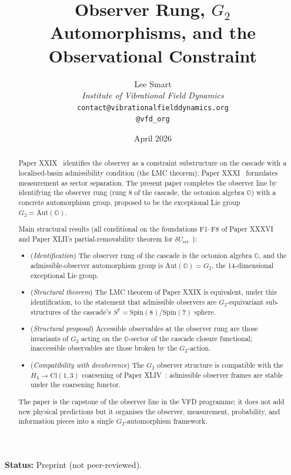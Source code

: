 \documentclass[12pt]{article}
\title{Observer Rung, $G_2$ Automorphisms, and the Observational Constraint}
\author{%
  Lee Smart\\[4pt]
  \textit{Institute of Vibrational Field Dynamics}\\[2pt]
  \texttt{contact@vibrationalfielddynamics.org}\\[2pt]
  \texttt{@vfd\_org}%
}
\date{April 2026}
\theoremstyle{definition}
\theoremstyle{remark}
\newcommand{\Oo}{\mathbb{O}}
\newcommand{\Gtwo}{G_2}
\newcommand{\Spin}{\mathrm{Spin}}
\newcommand{\Aut}{\mathrm{Aut}}
\newcommand{\Cl}{\mathrm{Cl}}
\begin{document}
\maketitle

\noindent\textbf{Status:} Preprint (not peer-reviewed).

\begin{abstract}
Paper XXIX~\citep{SmartXXIX} identifies the observer as a constraint substructure on the cascade with a localised-basin admissibility condition (the LMC theorem); Paper XXXI~\citep{SmartXXXI} formulates measurement as sector separation. The present paper completes the observer line by identifying the observer rung (rung $8$ of the cascade, the octonion algebra $\Oo$) with a concrete automorphism group, proposed to be the exceptional Lie group $\Gtwo = \Aut(\Oo)$.

Main structural results (all conditional on the foundations F1--F8 of Paper XXXVI~\citep{SmartXXXVI} and Paper XLII's partial-removability theorem for $\delta U_{\mathrm{rel}}$~\citep{SmartXLII}):
\begin{itemize}
\item (\emph{Identification}) The observer rung of the cascade is the octonion algebra $\Oo$, and the admissible-observer automorphism group is $\Aut(\Oo) = \Gtwo$, the 14-dimensional exceptional Lie group.
\item (\emph{Structural theorem}) The LMC theorem of Paper XXIX is equivalent, under this identification, to the statement that admissible observers are $\Gtwo$-equivariant sub-structures of the cascade's $S^7 = \Spin(8)/\Spin(7)$ sphere.
\item (\emph{Structural proposal}) Accessible observables at the observer rung are those invariants of $\Gtwo$ acting on the $\Oo$-sector of the cascade closure functional; inaccessible observables are those broken by the $\Gtwo$-action.
\item (\emph{Compatibility with decoherence}) The $\Gtwo$ observer structure is compatible with the $H_4 \to \Cl(1,3)$ coarsening of Paper XLIV~\citep{SmartXLIV}: admissible observer frames are stable under the coarsening functor.
\end{itemize}
The paper is the capstone of the observer line in the VFD programme; it does not add new physical predictions but it organises the observer, measurement, probability, and information pieces into a single $\Gtwo$-automorphism framework.
\end{abstract}

\end{document}
